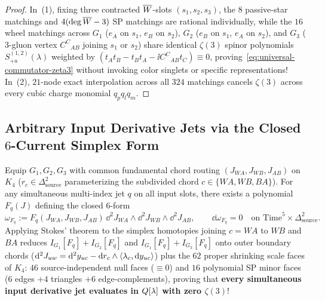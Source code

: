 \begin{proof}
In~(1), fixing three contracted $\overline{W}$-slots $(s_1,s_2,s_3)$, the $8$ passive-star matchings and $4(\deg\overline{W}-3)$ SP matchings are rational individually, while the $16$ wheel matchings across $G_1$ ($e_A$ on $s_1$, $e_B$ on $s_2$), $G_2$ ($e_B$ on $s_1$, $e_A$ on $s_2$), and $G_3$ ($3$-gluon vertex $C^C{}_{AB}$ joining $s_1$ or $s_2$) share identical $\zeta(3)$ spinor polynomials $S^{(1,2)}_{+\dot{a}}(\lambda)$ weighted by $(t_A t_B - t_B t_A - \ii C^C{}_{AB}t_C) \equiv 0$, proving~\eqref{eq:universal-commutator-zeta3} without invoking color singlets or specific representations! In~(2), $21$-node exact interpolation across all $324$ matchings cancels $\zeta(3)$ across every cubic charge monomial $q_p q_l q_m$.
\end{proof}

\subsection{Arbitrary Input Derivative Jets via the Closed \texorpdfstring{$6$}{6}-Current Simplex Form}
\label{subsec:simplex-jets}

\begin{theorem}
\label{thm:simplex-jets}
Equip $G_1, G_2, G_3$ with common fundamental chord routing $(J_{WA}, J_{WB}, J_{AB})$ on $K_4$ ($r_c \in \Delta^2_{\mathrm{source}}$ parameterizing the subdivided chord $c \in \{WA, WB, BA\}$). For any simultaneous multi-index jet $q$ on all input slots, there exists a polynomial $F_q(J)$ defining the closed $6$-form
\begin{equation}
\label{eq:closed-6current-form}
\omega_{F_q} := F_q(J_{WA}, J_{WB}, J_{AB})\,\dd^2 J_{WA}\wedge\dd^2 J_{WB}\wedge\dd^2 J_{AB},\qquad
\dd\omega_{F_q} = 0\quad \text{on }\mathrm{Time}^5\times\Delta^2_{\mathrm{source}}.
\end{equation}
Applying Stokes' theorem to the simplex homotopies joining $c = WA$ to $WB$ and $BA$ reduces $I_{G_1}[F_q] + I_{G_2}[F_q]$ and $I_{G_1}[F_q] + I_{G_3}[F_q]$ onto outer boundary chords ($\mathrm{d}^2 J_{uw} = \mathrm{d}^2 y_{uc} - \mathrm{d} r_c\wedge\langle\lambda_{c}, \mathrm{d} y_{uc}\rangle$) plus the $62$ proper shrinking scale faces of $K_4$: $46$ source-independent null faces ($\equiv 0$) and $16$ polynomial SP minor faces ($6$ edges $+ 4$ triangles $+ 6$ edge-complements), proving that \textbf{every simultaneous input derivative jet evaluates in $Q[\lambda]$ with zero $\zeta(3)$}!
\end{theorem}

